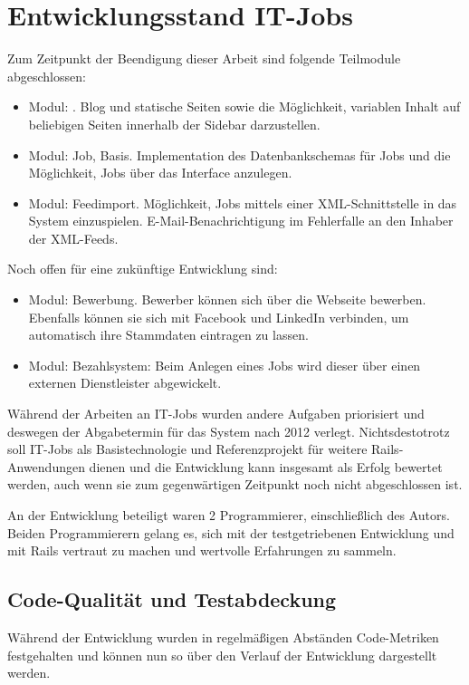\section{Entwicklungsstand IT-Jobs}
Zum Zeitpunkt der Beendigung dieser Arbeit sind folgende Teilmodule abgeschlossen:
\begin{itemize}
 \item Modul: . Blog und statische Seiten sowie die Möglichkeit, variablen Inhalt auf beliebigen Seiten innerhalb der Sidebar darzustellen.
 \item Modul: Job, Basis. Implementation des Datenbankschemas für Jobs und die Möglichkeit, Jobs über das Interface anzulegen.
 \item Modul: Feedimport. Möglichkeit, Jobs mittels einer XML-Schnittstelle in das System einzuspielen. E-Mail-Benachrichtigung im Fehlerfalle an den Inhaber der XML-Feeds.
\end{itemize}
Noch offen für eine zukünftige Entwicklung sind:
\begin{itemize}
 \item Modul: Bewerbung. Bewerber können sich über die Webseite bewerben. Ebenfalls können sie sich mit Facebook und LinkedIn verbinden, um automatisch ihre Stammdaten eintragen zu lassen.
 \item Modul: Bezahlsystem: Beim Anlegen eines Jobs wird dieser über einen externen Dienstleister abgewickelt.
\end{itemize}

Während der Arbeiten an IT-Jobs wurden andere Aufgaben priorisiert und deswegen der Abgabetermin für das System nach 2012 verlegt. Nichtsdestotrotz soll IT-Jobs als Basistechnologie und Referenzprojekt für weitere Rails-Anwendungen dienen und die Entwicklung kann insgesamt als Erfolg bewertet werden, auch wenn sie zum gegenwärtigen Zeitpunkt noch nicht abgeschlossen ist.

An der Entwicklung beteiligt waren 2 Programmierer, einschließlich des Autors. Beiden Programmierern gelang es, sich mit der testgetriebenen Entwicklung und mit Rails vertraut zu machen und wertvolle Erfahrungen zu sammeln.

\subsection*{Code-Qualität und Testabdeckung}
Während der Entwicklung wurden in regelmäßigen Abständen Code-Metriken festgehalten und können nun so über den Verlauf der Entwicklung dargestellt werden.

